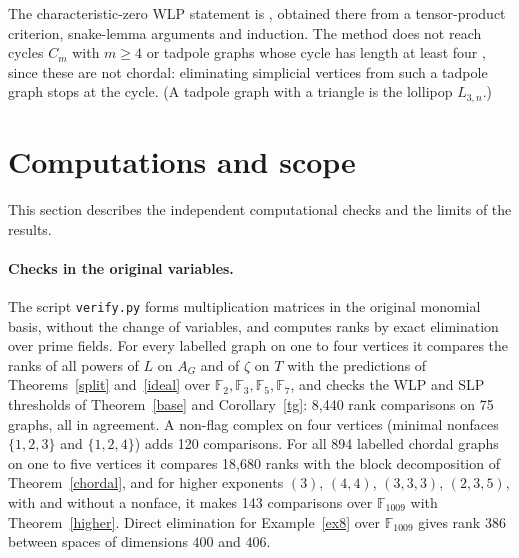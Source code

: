\documentclass[11pt,a4paper]{article}
\theoremstyle{definition}
\begin{document}
The characteristic-zero WLP statement is \cite[Theorem~1.3]{TPS}, obtained there from a tensor-product criterion, snake-lemma arguments and induction. The method does not reach cycles $C_m$ with $m\ge4$ or tadpole graphs whose cycle has length at least four \cite{NT,TPS2}, since these are not chordal: eliminating simplicial vertices from such a tadpole graph stops at the cycle. (A tadpole graph with a triangle is the lollipop $L_{3,n}$.)

\section{Computations and scope}\label{sec:scope}

This section describes the independent computational checks and the limits of the results.

\paragraph{Checks in the original variables.}
The script \texttt{verify.py} forms multiplication matrices in the original monomial basis, without the change of variables, and computes ranks by exact elimination over prime fields. For every labelled graph on one to four vertices it compares the ranks of all powers of $L$ on $A_G$ and of $\zeta$ on $T$ with the predictions of Theorems~\ref{split} and~\ref{ideal} over $\mathbb F_2,\mathbb F_3,\mathbb F_5,\mathbb F_7$, and checks the WLP and SLP thresholds of Theorem~\ref{base} and Corollary~\ref{tg}: 8{,}440 rank comparisons on 75 graphs, all in agreement. A non-flag complex on four vertices (minimal nonfaces $\{1,2,3\}$ and $\{1,2,4\}$) adds 120 comparisons. For all 894 labelled chordal graphs on one to five vertices it compares 18{,}680 ranks with the block decomposition of Theorem~\ref{chordal}, and for higher exponents $(3)$, $(4,4)$, $(3,3,3)$, $(2,3,5)$, with and without a nonface, it makes 143 comparisons over $\mathbb F_{1009}$ with Theorem~\ref{higher}. Direct elimination for Example~\ref{ex8} over $\mathbb F_{1009}$ gives rank $386$ between spaces of dimensions $400$ and $406$.
\end{document}
